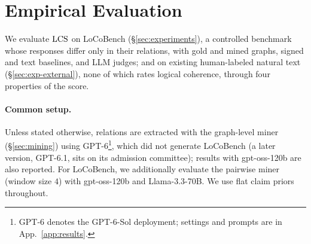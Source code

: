 \section{Empirical Evaluation}
\label{sec:eval}

We evaluate $\mathrm{LCS}$ on LoCoBench (§\ref{sec:experiments}), a controlled benchmark whose responses
differ only in their relations, with gold and mined graphs, signed and text baselines, and LLM
judges; and on existing human-labeled natural text (§\ref{sec:exp-external}), none of which rates
logical coherence, through four properties of the score.

\paragraph{Common setup.} Unless stated otherwise, relations are extracted with the 
graph-level miner (§\ref{sec:mining}) using GPT-6\footnote{GPT-6 denotes the GPT-6-Sol
deployment; settings and prompts are in App.~\ref{app:results}.}, which did not generate
LoCoBench (a later version, GPT-6.1, sits on its admission committee); results with gpt-oss-120b are
also reported. For LoCoBench, we additionally evaluate the pairwise miner (window size $4$) with
gpt-oss-120b and Llama-3.3-70B. We use flat claim priors throughout.




